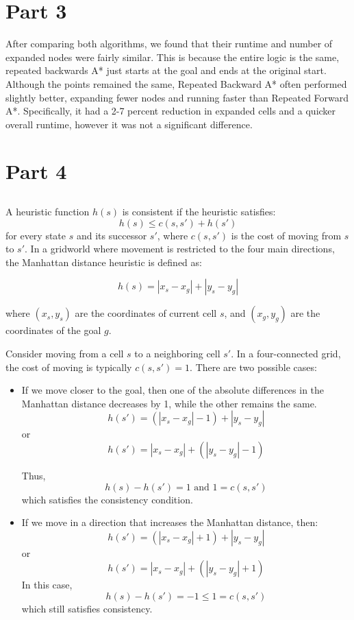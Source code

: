 \documentclass{article}
\begin{document}
\section{Part 3}
After comparing both algorithms, we found that their runtime and number of expanded nodes were fairly similar. This is because the entire logic is the same, repeated backwards A* just starts at the goal and ends at the original start. Although the points remained the same, Repeated Backward A* often performed slightly better, expanding fewer nodes and running faster than Repeated Forward A*. Specifically, it had a 2-7 percent reduction in expanded cells and a quicker overall runtime, however it was not a significant difference.

\section{Part 4}

\subsection{}

A heuristic function $h(s)$ is consistent if the heuristic satisfies:
\[ h(s) \leq c(s, s') + h(s') \]
for every state $s$ and its successor $s'$, where $c(s, s')$ is the cost of moving from $s$ to $s'$. In a gridworld where movement is restricted to the four main directions, the Manhattan distance heuristic is defined as:

   \[h(s) = |x_s - x_g| + |y_s - y_g| \] 

where $(x_s, y_s)$ are the coordinates of current cell $s$, and $(x_g, y_g)$ are the coordinates of the goal $g$.

Consider moving from a cell $s$ to a neighboring cell $s'$. In a four-connected grid, the cost of moving is typically $c(s, s') = 1$. There are two possible cases:

\begin{itemize}
    \item If we move closer to the goal, then one of the absolute differences in the Manhattan distance decreases by 1, while the other remains the same.
    \[ h(s') = (|x_s - x_g| - 1) + |y_s - y_g| \]
    or
    \[ h(s') = |x_s - x_g| + (|y_s - y_g| - 1) \]
    
    Thus,
    \[ h(s) - h(s') = 1 \text{ and } 1 = c(s, s')\]
    which satisfies the consistency condition.
    
    \item If we move in a direction that increases the Manhattan distance, then:
    \[ h(s') = (|x_s - x_g| + 1) + |y_s - y_g| \]
    or
    \[h(s') = |x_s - x_g| + (|y_s - y_g| + 1)\]
    In this case,
    \[h(s) - h(s') = -1 \leq 1 = c(s, s')\]
    which still satisfies consistency.
\end{itemize}
\end{document}
